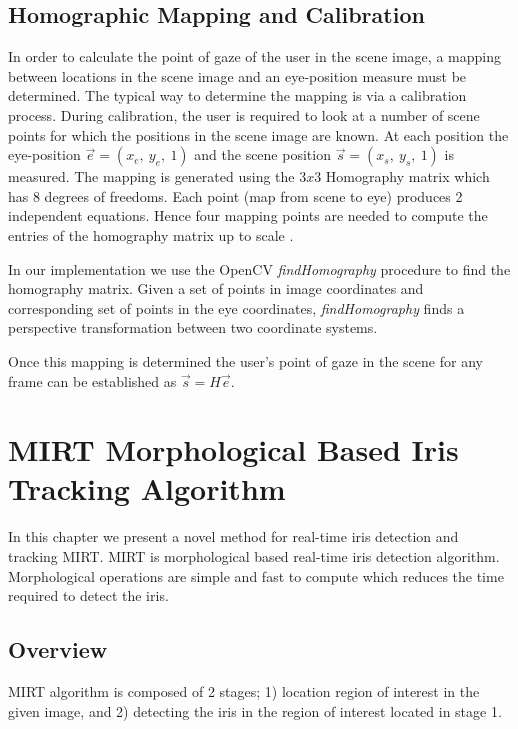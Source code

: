 \documentclass[12pt,fleqn]{book} %
\begin{document}
\section{Homographic Mapping and Calibration}
In order to calculate the point of gaze of the user in the scene image, a mapping between locations in the scene image and an eye-position measure must be determined. The typical way to determine the mapping is via a calibration process. During calibration, the user is required to look at a number of scene points for which the positions in the scene image are known. At each position the eye-position $\vec{e} = (x_{e} ,\: y_{e},\: 1)$ and the scene position $\vec{s} = (x_{s},\: y_{s},\: 1)$ is measured. The mapping is generated using the $3x3$ Homography matrix which has 8 degrees of freedoms. Each point (map from scene to eye) produces 2 independent equations. Hence four mapping points are needed to compute the entries of the homography matrix up to scale \cite{heuristic}. \bigskip

In our implementation we use the OpenCV \textit{findHomography} procedure to find the homography matrix. Given a set of points in image coordinates and corresponding set of points in the eye coordinates, \textit{findHomography} finds a perspective transformation between two coordinate systems. \bigskip

Once this mapping is determined the user’s point of gaze in the scene for any frame can be established
as $\vec{s} = H \vec{e}$.


\chapter{MIRT Morphological Based Iris Tracking Algorithm}
In this chapter we present a novel method for real-time iris detection and tracking MIRT. MIRT is morphological based real-time iris detection algorithm. Morphological operations are simple and fast to compute which reduces the time required to detect the iris.

\section{Overview}
MIRT algorithm is composed of 2 stages; 1) location region of interest in the given image, and 2) detecting the iris in the region of interest located in stage 1. 


\end{document}
